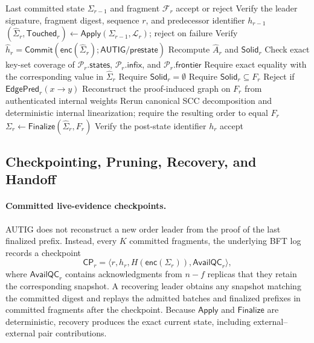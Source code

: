 \begin{algorithm}[t]
\caption{Authenticated Fragment-Local Verification}
\label{alg:authenticated-fragment-verification}
\begin{algorithmic}[1]
\Require Last committed state $\Sigma_{r-1}$ and fragment $\mathcal F_r$
\Ensure accept or reject
\State Verify the leader signature, fragment digest, sequence $r$, and
       predecessor identifier $h_{r-1}$
\State $(\widehat\Sigma_r,\mathsf{Touched}_r)\gets
       \mathsf{Apply}(\Sigma_{r-1},\mathcal L_r)$; reject on failure
\State Verify $\widehat h_r=
       \mathsf{Commit}(\mathsf{enc}(\widehat\Sigma_r);
       \mathsf{AUTIG/prestate})$
\State Recompute $\widehat A_r$ and $\mathsf{Solid}_r$
\State Check exact key-set coverage of $\mathcal P_r.\mathsf{states}$,
       $\mathcal P_r.\mathsf{infix}$, and
       $\mathcal P_r.\mathsf{frontier}$
  \State Require exact equality with the corresponding value in
         $\widehat\Sigma_r$
\EndFor
{}
  \State Require $\mathsf{Solid}_r=\emptyset$
\Else
  \State Require $\mathsf{Solid}_r\subseteq F_r$
\EndIf
{}
  \State Reject if $\mathsf{EdgePred}_r(x\to y)$
\EndFor
\State Reconstruct the proof-induced graph on $F_r$ from authenticated
       internal weights
\State Rerun canonical SCC decomposition and deterministic internal
       linearization; require the resulting order to equal $F_r$
\State $\Sigma_r\gets\mathsf{Finalize}(\widehat\Sigma_r,F_r)$
\State Verify the post-state identifier $h_r$
\State \Return accept
\end{algorithmic}
\end{algorithm}

\subsection{Checkpointing, Pruning, Recovery, and Handoff}
\label{sec:checkpoint-recovery-handoff}

\paragraph{Committed live-evidence checkpoints.}
AUTIG does not reconstruct a new order leader from the proof of the last
finalized prefix. Instead, every $K$ committed fragments, the underlying BFT
log records a checkpoint
\[
 \mathsf{CP}_r=\langle r,h_r,H(\mathsf{enc}(\Sigma_r)),\mathsf{AvailQC}_r\rangle,
\]
where $\mathsf{AvailQC}_r$ contains acknowledgments from $n-f$ replicas that
they retain the corresponding snapshot. A recovering leader obtains any
snapshot matching the committed digest and replays the admitted batches and
finalized prefixes in committed fragments after the checkpoint. Because
$\mathsf{Apply}$ and $\mathsf{Finalize}$ are deterministic, recovery produces
the exact current state, including external--external pair contributions.

